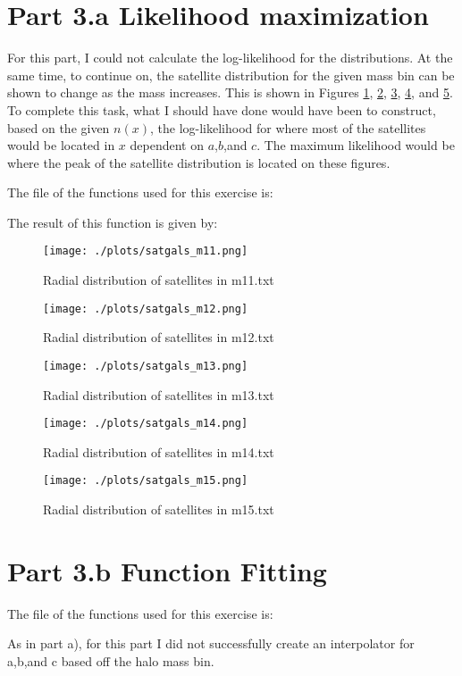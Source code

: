 \section{Part 3.a Likelihood maximization}

For this part, I could not calculate the log-likelihood for the distributions. At the same time, to continue on,
the satellite distribution for the given mass bin can be shown to change as the mass increases. This is shown in Figures
\ref{fig:m11}, \ref{fig:m12}, \ref{fig:m13}, \ref{fig:m14}, and \ref{fig:m15}. To complete this task, what I should have
done would have been to construct, based on the given $n(x)$, the log-likelihood for where most of the satellites would
be located in $x$ dependent on $a$,$b$,and $c$. The maximum likelihood would be where the peak of the satellite distribution
is located on these figures.

The file of the functions used for this exercise is:



The result of this function is given by:

%

\begin{figure}[h!]
  \centering
  \texttt{[image: ./plots/satgals\_m11.png]}
  \caption{Radial distribution of satellites in m11.txt}
  \label{fig:m11}
\end{figure}

\begin{figure}[h!]
  \centering
  \texttt{[image: ./plots/satgals\_m12.png]}
  \caption{Radial distribution of satellites in m12.txt}
  \label{fig:m12}
\end{figure}

\begin{figure}[h!]
  \centering
  \texttt{[image: ./plots/satgals\_m13.png]}
  \caption{Radial distribution of satellites in m13.txt}
  \label{fig:m13}
\end{figure}

\begin{figure}[h!]
  \centering
  \texttt{[image: ./plots/satgals\_m14.png]}
  \caption{Radial distribution of satellites in m14.txt}
  \label{fig:m14}
\end{figure}

\begin{figure}[h!]
  \centering
  \texttt{[image: ./plots/satgals\_m15.png]}
  \caption{Radial distribution of satellites in m15.txt}
  \label{fig:m15}
\end{figure}

\section{Part 3.b Function Fitting}

The file of the functions used for this exercise is:

%

As in part a), for this part I did not successfully create an interpolator for a,b,and c based off the halo mass bin.